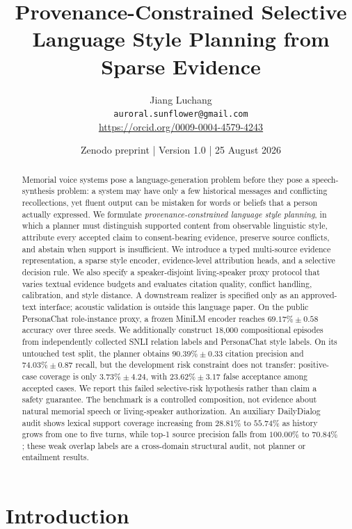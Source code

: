 \documentclass[11pt,a4paper]{article}
\title{Provenance-Constrained Selective Language Style Planning from Sparse Evidence}
\author{Jiang Luchang\\
\texttt{auroral.sunflower@gmail.com}\\
\url{https://orcid.org/0009-0004-4579-4243}}
\date{Zenodo preprint | Version 1.0 | 25 August 2026}
\begin{document}
\maketitle

\begin{abstract}
Memorial voice systems pose a language-generation problem before they pose a
  speech-synthesis problem: a system may have only a few historical messages and
  conflicting recollections, yet fluent output can be mistaken for words or
  beliefs that a person actually expressed.  We formulate
  \emph{provenance-constrained language style planning}, in which a
planner must distinguish supported content from observable linguistic style,
attribute every accepted claim to consent-bearing evidence, preserve source
conflicts, and abstain when support is insufficient.  We introduce a typed
multi-source evidence representation, a sparse style encoder, evidence-level
attribution heads, and a selective decision rule.  We also specify a
speaker-disjoint living-speaker proxy protocol that varies textual evidence
budgets and evaluates citation quality, conflict handling, calibration, and
  style distance.  A downstream realizer is specified only as an approved-text
  interface; acoustic validation is outside this language paper.
On the public PersonaChat role-instance proxy, a frozen MiniLM encoder reaches
$69.17\%\pm0.58$ accuracy over three seeds.  We additionally construct 18,000
compositional episodes from independently collected SNLI relation labels and
PersonaChat style labels.  On its untouched test split, the planner obtains
$90.39\%\pm0.33$ citation precision and $74.03\%\pm0.87$ recall, but the
development risk constraint does not transfer: positive-case coverage is only
$3.73\%\pm4.24$, with $23.62\%\pm3.17$ false acceptance among accepted cases.
We report this failed selective-risk hypothesis rather than claim a safety
guarantee.  The benchmark is a controlled composition, not evidence about
natural memorial speech or living-speaker authorization.  An auxiliary
DailyDialog audit shows lexical support coverage increasing from $28.81\%$ to
$55.74\%$ as history grows from one to five turns, while top-1 source
precision falls from $100.00\%$ to $70.84\%$; these weak overlap labels are a
cross-domain structural audit, not planner or entailment results.
\end{abstract}

\section{Introduction}
\end{document}
